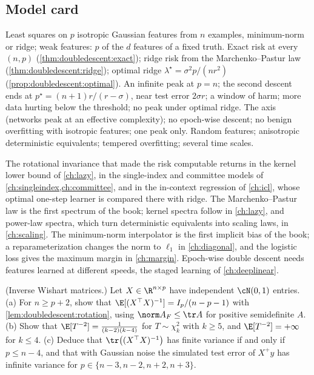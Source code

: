\begin{refsection}
\section{Model card}\label{sec:doubledescent:card}

{Least squares on $p$ isotropic Gaussian features from $n$ examples, minimum-norm or ridge; weak features: $p$ of the $d$ features of a fixed truth.}
{Exact risk at every $(n,p)$ (\cref{thm:doubledescent:exact}); ridge risk from the Marchenko--Pastur law (\cref{thm:doubledescent:ridge}); optimal ridge $\lambda^\star=\sigma^2p/(nr^2)$ (\cref{prop:doubledescent:optimal}).}
{An infinite peak at $p=n$; the second descent ends at $p^\star=(n+1)r/(r-\sigma)$, near test error $2\sigma r$; a window of harm; more data hurting below the threshold; no peak under optimal ridge.}
{The axis (networks peak at an effective complexity); no epoch-wise descent; no benign overfitting with isotropic features; one peak only.}
{Random features; anisotropic deterministic equivalents; tempered overfitting; several time scales.}

The rotational invariance that made the risk computable returns in the kernel lower bound of \cref{ch:lazy}, in the single-index and committee models of \cref{ch:singleindex,ch:committee}, and in the in-context regression of \cref{ch:icl}, whose optimal one-step learner is compared there with ridge. The Marchenko--Pastur law is the first spectrum of the book; kernel spectra follow in \cref{ch:lazy}, and power-law spectra, which turn deterministic equivalents into scaling laws, in \cref{ch:scaling}. The minimum-norm interpolator is the first implicit bias of the book; a reparameterization changes the norm to $\ell_1$ in \cref{ch:diagonal}, and the logistic loss gives the maximum margin in \cref{ch:margin}. Epoch-wise double descent needs features learned at different speeds, the staged learning of \cref{ch:deeplinear}.

\begin{exercises}
\item \consolidation (Inverse Wishart matrices.) Let $X\in\R^{n\times p}$ have independent $\cN(0,1)$ entries. (a) For $n\ge p+2$, show that $\E[(X^\top X)^{-1}]=I_p/(n-p-1)$ with \cref{lem:doubledescent:rotation}, using $\norm A_F\le\tr A$ for positive semidefinite $A$. (b) Show that $\E[T^{-2}]=\frac1{(k-2)(k-4)}$ for $T\sim\chi^2_k$ with $k\ge5$, and $\E[T^{-2}]=+\infty$ for $k\le4$. (c) Deduce that $\tr\bigl((X^\top X)^{-1}\bigr)$ has finite variance if and only if $p\le n-4$, and that with Gaussian noise the simulated test error of $X^+y$ has infinite variance for $p\in\{n-3,n-2,n+2,n+3\}$.\label{ex:doubledescent:wishart}


\end{exercises}
\end{refsection}
